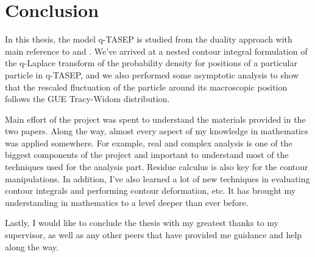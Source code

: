 \chapter{Conclusion}
In this thesis, the model q-TASEP is studied from the duality approach with main reference to \cite{duality2014} and \cite{asymptotics2013}. We've arrived at a nested contour integral formulation of the q-Laplace transform of the probability density for positions of a particular particle in q-TASEP, and we also performed some asymptotic analysis to show that the rescaled fluctuation of the particle around its macroscopic position follows the GUE Tracy-Widom distribution.

Main effort of the project was spent to understand the materials provided in the two papers. Along the way, almost every aspect of my knowledge in mathematics was applied somewhere. For example, real and complex analysis is one of the biggest components of the project and important to understand most of the techniques used for the analysis part. Residue calculus is also key for the contour manipulations. In addition, I've also learned a lot of new techniques in evaluating contour integrals and performing contour deformation, etc. It has brought my understanding in mathematics to a level deeper than ever before. 

Lastly, I would like to conclude the thesis with my greatest thanks to my supervisor, as well as any other peers that have provided me guidance and help along the way. 